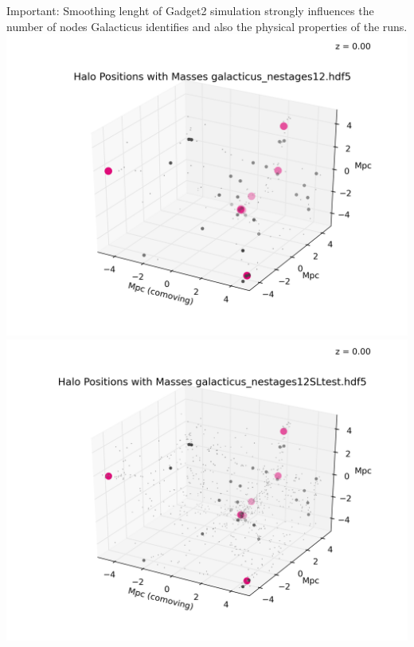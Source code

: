 \documentclass[a4paper,11pt,fleqn,oneside]{book}
\begin{document}
\begin{itemize}
Important: Smoothing lenght of Gadget2 simulation strongly influences 
the number of nodes Galacticus identifies and also the physical properties 
of the runs. \\
\includegraphics[scale=0.75]{analysis/galacticus/positionPlotsMasses/Halo_Positions_with_Masses_galacticus_nestages12_5Mpc_0003.png} \\
\includegraphics[scale=0.75]{analysis/galacticus/positionPlotsMasses/Halo_Positions_with_Masses_galacticus_nestages12SLtest_5Mpc_0003.png} \\

\end{itemize}
\end{document}
